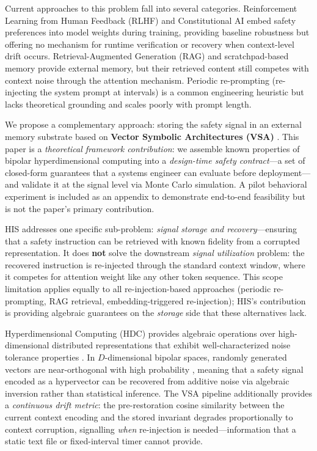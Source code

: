 \documentclass[a4paper,11pt]{article}
\begin{document}
Current approaches to this problem fall into several categories. Reinforcement Learning from Human Feedback (RLHF) \cite{ouyang2022} and Constitutional AI \cite{bai2022} embed safety preferences into model weights during training, providing baseline robustness but offering no mechanism for runtime verification or recovery when context-level drift occurs. Retrieval-Augmented Generation (RAG) \cite{lewis2020} and scratchpad-based memory \cite{nye2021} provide external memory, but their retrieved content still competes with context noise through the attention mechanism. Periodic re-prompting (re-injecting the system prompt at intervals) is a common engineering heuristic but lacks theoretical grounding and scales poorly with prompt length.

We propose a complementary approach: storing the safety signal in an external memory substrate based on \textbf{Vector Symbolic Architectures (VSA)} \cite{kanerva2009, plate1995, gayler2003}. This paper is a \textit{theoretical framework contribution}: we assemble known properties of bipolar hyperdimensional computing into a \textit{design-time safety contract}---a set of closed-form guarantees that a systems engineer can evaluate before deployment---and validate it at the signal level via Monte Carlo simulation. A pilot behavioral experiment is included as an appendix to demonstrate end-to-end feasibility but is not the paper's primary contribution.

HIS addresses one specific sub-problem: \textit{signal storage and recovery}---ensuring that a safety instruction can be retrieved with known fidelity from a corrupted representation. It does \textbf{not} solve the downstream \textit{signal utilization} problem: the recovered instruction is re-injected through the standard context window, where it competes for attention weight like any other token sequence. This scope limitation applies equally to all re-injection-based approaches (periodic re-prompting, RAG retrieval, embedding-triggered re-injection); HIS's contribution is providing algebraic guarantees on the \textit{storage} side that these alternatives lack.

Hyperdimensional Computing (HDC) provides algebraic operations over high-dimensional distributed representations that exhibit well-characterized noise tolerance properties \cite{kanerva2009, thomas2021}. In $D$-dimensional bipolar spaces, randomly generated vectors are near-orthogonal with high probability \cite{kanerva2009, vershynin2018}, meaning that a safety signal encoded as a hypervector can be recovered from additive noise via algebraic inversion rather than statistical inference. The VSA pipeline additionally provides a \textit{continuous drift metric}: the pre-restoration cosine similarity between the current context encoding and the stored invariant degrades proportionally to context corruption, signalling \textit{when} re-injection is needed---information that a static text file or fixed-interval timer cannot provide.
\end{document}
